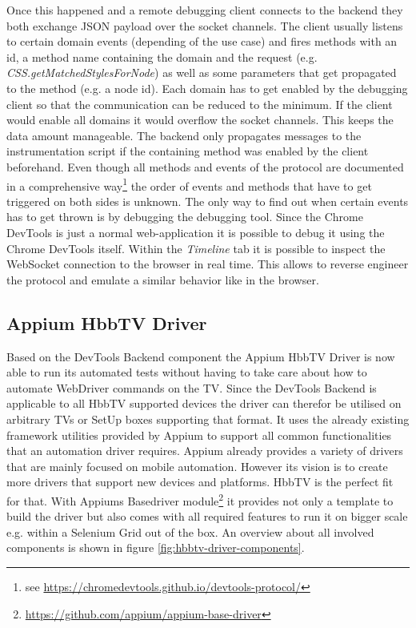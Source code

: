 Once this happened and a remote debugging client connects to the backend they both exchange JSON
payload over the socket channels. The client usually listens to certain domain events (depending
of the use case) and fires methods with an id, a method name containing the domain and the request
(e.g. \textit{CSS.getMatchedStylesForNode}) as well as some parameters that get propagated to the
method (e.g. a node id). Each domain has to get enabled by the debugging client so that the
communication can be reduced to the minimum. If the client would enable all domains it would
overflow the socket channels. This keeps the data amount manageable. The backend only propagates
messages to the instrumentation script if the containing method was enabled by the client
beforehand. Even though all methods and events of the protocol are documented in a comprehensive
way\footnote{see \url{https://chromedevtools.github.io/devtools-protocol/}} the order of events
and methods that have to get triggered on both sides is unknown. The only way to find out when
certain events has to get thrown is by debugging the debugging tool. Since the Chrome DevTools
is just a normal web-application it is possible to debug it using the Chrome DevTools itself.
Within the \textit{Timeline} tab it is possible to inspect the WebSocket connection to the browser
in real time. This allows to reverse engineer the protocol and emulate a similar behavior like in
the browser.

\subsection{Appium HbbTV Driver\label{sec:appiumhbbtvdriver}}

Based on the DevTools Backend component the Appium HbbTV Driver is now able to run its automated
tests without having to take care about how to automate WebDriver commands on the TV. Since the
DevTools Backend is applicable to all HbbTV supported devices the driver can therefor be utilised
on arbitrary TVs or SetUp boxes supporting that format. It uses the already existing framework
utilities provided by Appium to support all common functionalities that an automation driver
requires. Appium already provides a variety of drivers that are mainly focused on mobile automation.
However its vision is to create more drivers that support new devices and platforms. HbbTV is the
perfect fit for that. With Appiums Basedriver module\footnote{\url{https://github.com/appium/appium-base-driver}}
it provides not only a template to build the driver but also comes with all required features to
run it on bigger scale e.g. within a Selenium Grid out of the box. An overview about all involved
components is shown in figure \ref{fig:hbbtv-driver-components}.

